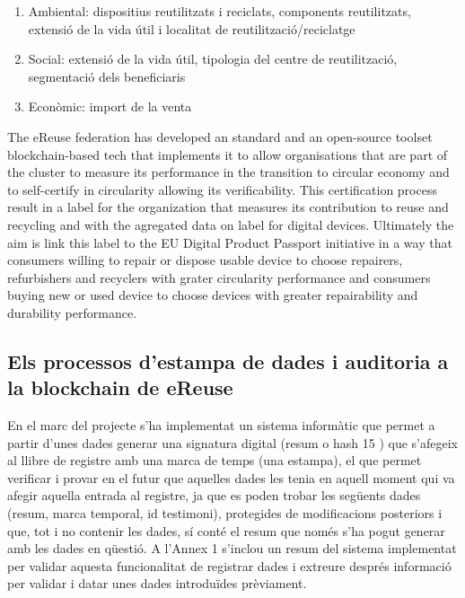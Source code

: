 \documentclass[
]{book}
\begin{document}
\begin{enumerate}
\def\labelenumi{\arabic{enumi}.}
\item
  Ambiental: dispositius reutilitzats i reciclats, components reutilitzats, extensió de la vida útil i localitat de reutilització/reciclatge
\item
  Social: extensió de la vida útil, tipologia del centre de reutilització, segmentació dels beneficiaris
\item
  Econòmic: import de la venta
\end{enumerate}

The eReuse federation has developed an standard and an open-source toolset blockchain-based tech that implements it to allow organisations that are part of the cluster to measure its performance in the transition to circular economy and to self-certify in circularity allowing its verificability. This certification process result in a label for the organization that measures its contribution to reuse and recycling and with the agregated data on label for digital devices. Ultimately the aim is link this label to the EU Digital Product Passport initiative in a way that consumers willing to repair or dispose usable device to choose repairers, refurbishers and recyclers with grater circularity performance and consumers buying new or used device to choose devices with greater repairability and durability performance.

\hypertarget{els-processos-destampa-de-dades-i-auditoria-a-la-blockchain-de-ereuse}{%
\subsection{Els processos d'estampa de dades i auditoria a la blockchain de eReuse}\label{els-processos-destampa-de-dades-i-auditoria-a-la-blockchain-de-ereuse}}

En el marc del projecte s'ha implementat un sistema informàtic que permet a partir d'unes dades generar una signatura digital (resum o hash 15 ) que s'afegeix al llibre de registre amb una marca de temps (una estampa), el que permet verificar i provar en el futur que aquelles dades les tenia en aquell moment qui va afegir aquella entrada al registre, ja que es poden trobar les següents dades (resum, marca temporal, id testimoni), protegides de modificacions posteriors i que, tot i no contenir les dades, sí conté el resum que només s'ha pogut generar amb les dades en qüestió. A l'Annex 1 s'inclou un resum del sistema implementat per validar aquesta funcionalitat de registrar dades i extreure després informació per validar i datar unes dades introduïdes prèviament.
\end{document}
